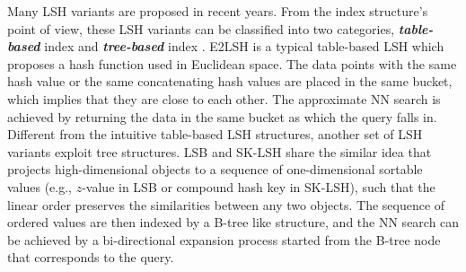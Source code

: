 Many LSH variants are proposed in recent years. From the index structure's point of view, these LSH variants can be classified into two categories, \emph{\textbf{table-based}} index \cite{Panigrahy:2006:EBN:1109557.1109688, mplsh,c2lsh,Haghani:2009:DSS:1516360.1516446,Huang:2015:QLH:2850469.2850470,Zheng:2016:LAN:2882903.2882930} and \emph{\textbf{tree-based}} index \cite{lsb,sklsh,Bawa:2005:LFS:1060745.1060840}. E2LSH \cite{datar} is a typical table-based LSH which proposes a hash function used in Euclidean space. The data points with the same hash value or the same concatenating hash values are placed in the same bucket, which implies that they are close to each other. The approximate NN search is achieved by returning the data in the same bucket as which the query falls in. Different from the intuitive table-based LSH structures, another set of LSH variants exploit tree structures. LSB \cite{lsb} and SK-LSH \cite{sklsh} share the similar idea that projects high-dimensional objects to a sequence of one-dimensional sortable values (e.g., $z$-value in LSB or compound hash key in SK-LSH), such that the linear order preserves the similarities between any two objects. The sequence of ordered values are then indexed by a B-tree like structure, and the NN search can be achieved by a bi-directional expansion process started from the B-tree node that corresponds to the query.




